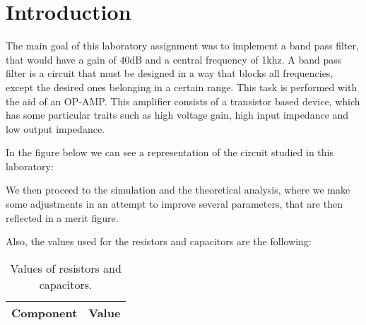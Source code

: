 \section{Introduction}

The main goal of this laboratory assignment was to implement a band pass filter, that would have a gain of 40dB and a central frequency of 1khz. A band pass filter is a circuit that must be designed in a way that blocks all frequencies, except the desired ones belonging in a certain range. This task is performed with the aid of an OP-AMP. This amplifier consists of a transistor based device, which has some particular traits such as high voltage gain, high input impedance and low output impedance.

In the figure below we can see a representation of the circuit studied in this laboratory:


We then proceed to the simulation and the theoretical analysis, where we make some adjustments in an attempt to improve several parameters, that are then reflected in a merit figure.

Also, the values used for the resistors and capacitors are the following:

\begin{table}[h]
  \centering
  \begin{tabular}{|l|r|}
    \hline    
    {\bf Component} & {\bf Value} \\ \hline
    
  \end{tabular}
  \caption{Values of resistors and capacitors.}
  \label{tab:valintro}
\end{table}
